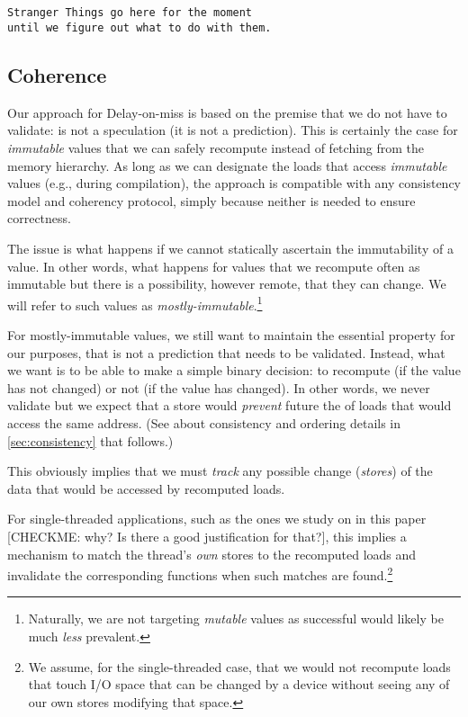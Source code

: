 \begin{verbatim}


Stranger Things go here for the moment 
until we figure out what to do with them.

 \end{verbatim}


\subsection{Coherence}
Our \recomp approach for Delay-on-miss is based on the premise that we do not have to validate: \recomp is not a speculation (it is not a prediction). This is certainly the case for \emph{immutable} values that we can safely recompute instead of fetching from the memory hierarchy. As long as we can designate the loads that access \emph{immutable} values (e.g., during compilation), the approach is compatible with any consistency model and coherency protocol, simply because neither is needed to ensure correctness.

The issue is what happens if we cannot statically ascertain the immutability of a value. In other words, what happens for values that we recompute often as immutable but there is a possibility, however remote, that they can change. We will refer to such values as \emph{mostly-immutable}.\footnote{Naturally, we are not targeting \emph{mutable} values as successful \recomp would likely be much \emph{less} prevalent.}

For mostly-immutable values, we still want to maintain the essential property for our purposes, that \recomp is not a prediction that needs to be validated. Instead, what we want is to be able to make a simple binary decision: to recompute (if the value has not changed) or not (if the value has changed). In other words, we never validate \recomp but we expect that a store would \emph{prevent} future the \recomp of loads that would access the same address. (See about consistency and ordering details in \autoref{sec:consistency} that follows.)

This obviously implies that we must \emph{track} any possible change (\emph{stores}) of the data that would be accessed by recomputed loads.

For single-threaded applications, {\color{blue} such as the ones we study on in this paper} {\color{red} [CHECKME: why? Is there a good justification for that?]}, this implies a mechanism to match the thread's \emph{own} stores to the recomputed loads and invalidate the corresponding \recomp functions when such matches are found.\footnote{We assume, for the single-threaded case, that we would not recompute loads that touch I/O space that can be changed by a device without seeing any of our own stores modifying that space.}

